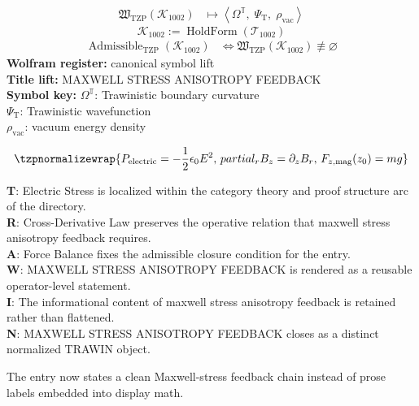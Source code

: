 \noindent
\begin{minipage}[t]{0.48\linewidth}
\begingroup
\small
\[
\begin{aligned}
\mathfrak{W}_{\mathrm{TZP}}\!\left(\mathcal{K}_{1002}\right)
&\longmapsto
\left\langle \Omega^{\mathbb{T}},\; \Psi_{\mathrm{T}},\; \rho_{\mathrm{vac}} \right\rangle
\end{aligned}
\]
\[
\mathcal{K}_{1002}
:=
\operatorname{HoldForm}\!\left(\mathcal{T}_{1002}\right)
\]
\[
\begin{aligned}
\operatorname{Admissible}_{\mathrm{TZP}}\!\left(\mathcal{K}_{1002}\right)
&\Longleftrightarrow
\mathfrak{W}_{\mathrm{TZP}}\!\left(\mathcal{K}_{1002}\right)\not\equiv\varnothing
\end{aligned}
\]
\textbf{Wolfram register:} canonical symbol lift\\
\textbf{Title lift:} MAXWELL STRESS ANISOTROPY FEEDBACK\\
\textbf{Symbol key:} \(\Omega^{\mathbb{T}}\): Trawinistic boundary curvature\\ \(\Psi_{\mathrm{T}}\): Trawinistic wavefunction\\ \(\rho_{\mathrm{vac}}\): vacuum energy density
\par
\endgroup
\end{minipage}\hfill
\begin{minipage}[t]{0.48\linewidth}
\[
\tzpnormalizewrap{P_{\mathrm{electric}}=-\frac{1}{2}\epsilon_0 E^{2},\,partial_r B_z=\partial_z B_r,\,F_{z,\mathrm{mag}}(z_0)=mg}
\]

\small
\textbf{T}: Electric Stress is localized within the category theory and proof structure arc of the directory.\\
\textbf{R}: Cross-Derivative Law preserves the operative relation that maxwell stress anisotropy feedback requires.\\
\textbf{A}: Force Balance fixes the admissible closure condition for the entry.\\
\textbf{W}: MAXWELL STRESS ANISOTROPY FEEDBACK is rendered as a reusable operator-level statement.\\
\textbf{I}: The informational content of maxwell stress anisotropy feedback is retained rather than flattened.\\
\textbf{N}: MAXWELL STRESS ANISOTROPY FEEDBACK closes as a distinct normalized TRAWIN object.
\normalsize
\end{minipage}

The entry now states a clean Maxwell-stress feedback chain instead of prose labels embedded into display math.
\clearpage

